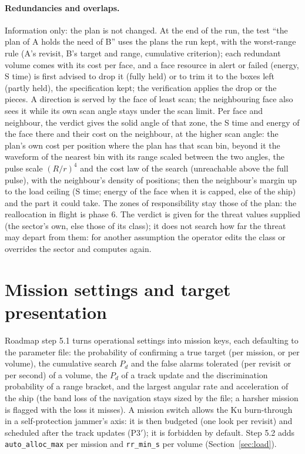 \documentclass[11pt,a4paper]{article}
\newcommand{\code}[1]{\texttt{\small #1}}
\begin{document}
\paragraph{Redundancies and overlaps.} Information only: the plan is not changed. At the end of the run, the test ``the
plan of A holds the need of B'' uses the plans the run kept, with the worst-range rule (A's
revisit, B's target and range, cumulative criterion); each redundant volume comes with its cost per face, and a face
resource in alert or failed (energy, S time) is first advised to drop it (fully held) or to trim it to the boxes left
(partly held), the specification kept; the verification applies the drop or the pieces. A direction is served by the
face of least scan; the neighbouring face also sees it while its own scan angle stays under the scan limit. Per face
and neighbour, the verdict gives the solid angle of that zone, the S time and energy of the face there and their cost on
the neighbour, at the higher scan angle: the plan's own cost per position where the plan has that scan bin, beyond it
the waveform of the nearest bin with its range scaled between the two angles, the pulse scale $(R/r)^4$ and the cost
law of the search (unreachable above the full pulse), with the neighbour's density of positions; then the neighbour's
margin up to the load ceiling (S time; energy of the face when it is capped, else of the ship) and the part it could
take. The zones of responsibility stay those of the plan: the reallocation in flight is phase 6. The verdict is given for the
threat values supplied (the sector's own, else those of its class); it does not search how far the threat may depart
from them: for another assumption the operator edits the class or overrides the sector and computes again.

\section{Mission settings and target presentation}\label{sec:mission51}
Roadmap step 5.1 turns operational settings into mission keys, each defaulting to the parameter file: the probability
of confirming a true target (per mission, or per volume), the cumulative search $P_d$ and the false alarms tolerated
(per revisit or per second) of a volume, the $P_d$ of a track update and the discrimination probability of a range
bracket, and the largest angular rate and acceleration of the ship (the band loss of the navigation stays sized by the
file; a harsher mission is flagged with the loss it misses). A mission switch allows the Ku burn-through in a
self-protection jammer's axis: it is then budgeted (one look per revisit) and scheduled after the track updates (P3$'$);
it is forbidden by default. Step 5.2 adds \code{auto\_alloc\_max} per mission and \code{rr\_min\_s} per volume
(Section~\ref{sec:load}).
\end{document}

